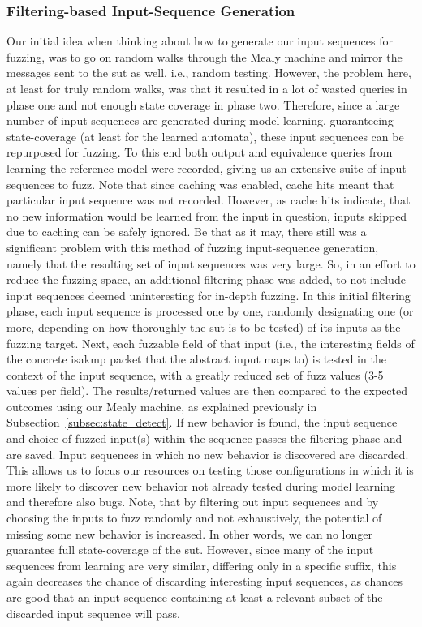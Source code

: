 \subsubsection{Filtering-based Input-Sequence Generation} \label{subsubsec:fuzz_filtering}
Our initial idea when thinking about how to generate our input sequences for fuzzing, was to go on random walks through the Mealy machine and mirror the messages sent to the \ac{sut} as well, i.e., random testing. However, the problem here, at least for truly random walks, was that it resulted in a lot of wasted queries in phase one and not enough state coverage in phase two. Therefore, since a large number of input sequences are generated during model learning, guaranteeing state-coverage (at least for the learned automata), these input sequences can be repurposed for fuzzing. To this end both output and equivalence queries from learning the reference model were recorded, giving us an extensive suite of input sequences to fuzz. Note that since caching was enabled, cache hits meant that particular input sequence was not recorded. However, as cache hits indicate, that no new information would be learned from the input in question, inputs skipped due to caching can be safely ignored. Be that as it may, there still was a significant problem with this method of fuzzing input-sequence generation, namely that the resulting set of input sequences was very large. So, in an effort to reduce the fuzzing space, an additional filtering phase was added, to not include input sequences deemed uninteresting for in-depth fuzzing. In this initial filtering phase, each input sequence is processed one by one, randomly designating one (or more, depending on how thoroughly the \ac{sut} is to be tested) of its inputs as the fuzzing target. Next, each fuzzable field of that input (i.e., the interesting fields of the concrete \ac{isakmp} packet that the abstract input maps to) is tested in the context of the input sequence, with a greatly reduced set of fuzz values (3-5 values per field). The results/returned values are then compared to the expected outcomes using our Mealy machine, as explained previously in Subsection~\ref{subsec:state_detect}. If new behavior is found, the input sequence and choice of fuzzed input(s) within the sequence passes the filtering phase and are saved. Input sequences in which no new behavior is discovered are discarded. This allows us to focus our resources on testing those configurations in which it is more likely to discover new behavior not already tested during model learning and therefore also bugs.
Note, that by filtering out input sequences and by choosing the inputs to fuzz randomly and not exhaustively, the potential of missing some new behavior is increased. In other words, we can no longer guarantee full state-coverage of the \ac{sut}. However, since many of the input sequences from learning are very similar, differing only in a specific suffix, this again decreases the chance of discarding interesting input sequences, as chances are good that an input sequence containing at least a relevant subset of the discarded input sequence will pass. \\

